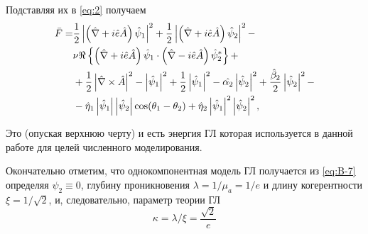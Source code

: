 Подставляя их в \eqref{eq:2} получаем
\begin{align}
  \bar{F} = & \frac{1}{2}\left| \left( \hat{\nabla} + i\hat{e}\hat{A} \right)
    \hat{\psi}_1 \right|^2 + \frac{1}{2}\left| \left( \hat{\nabla} + i\hat{e}\hat{A}
    \right)\hat{\psi}_2 \right|^2 - \nonumber \\ 
  & \nu\Re\left\{ \left( \hat{\nabla} + i\hat{e}\hat{A}
    \right) \hat{\psi}_1 \cdot \left( \hat{\nabla} - i\hat{e}\hat{A} \right)
    \hat{\psi}^*_2 \right\} + \nonumber \\
  & + \frac{1}{2}\left| \hat{\nabla}\times\hat{A} \right|^2 - \left| \hat{\psi}_1 \right|^2 +
    \frac{1}{2}\left| \hat{\psi}_1 \right|^2 - \hat{\alpha_2}\left| \hat{\psi}_2 \right|^2 +
    \frac{\hat{\beta}_2}{2}\left| \hat{\psi}_2 \right|^2 - \nonumber \\
  & - \hat{\eta}_1\left| \hat{\psi}_1 \right|\left| \hat{\psi}_2 \right| \cos(\theta_1 - \theta_2)
    + \hat{\eta}_2\left| \hat{\psi}_1 \right|^2 \left| \hat{\psi}_2 \right|^2, \label{eq:B-7}
\end{align}

Это (опуская верхнюю черту) и есть энергия ГЛ которая используется в данной 
работе для целей численного моделирования.

Окончательно отметим, что однокомпонентная модель ГЛ получается из 
\eqref{eq:B-7} определяя \( \psi_2 \equiv 0 \), глубину проникновения
\( \lambda = 1/\mu_a = 1/e \) и длину когерентности
\( \xi = 1/\sqrt{2} \), и, следовательно, параметр теории ГЛ
\begin{equation}
  \kappa = \lambda/\xi = \frac{\sqrt{2}}{e}
  \label{eq:B-8}
\end{equation}

\newpage